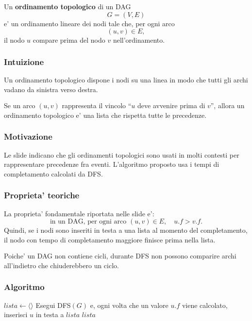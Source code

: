Un \textbf{ordinamento topologico} di un DAG
\[
G=(V,E)
\]
e' un ordinamento lineare dei nodi tale che, per ogni arco
\[
(u,v)\in E,
\]
il nodo $u$ compare prima del nodo $v$ nell'ordinamento.

\subsubsection{Intuizione}
Un ordinamento topologico dispone i nodi su una linea in modo che tutti gli archi vadano da sinistra verso destra.

Se un arco $(u,v)$ rappresenta il vincolo ``$u$ deve avvenire prima di $v$'', allora un ordinamento topologico e' una lista che rispetta tutte le precedenze.

\subsubsection{Motivazione}
Le slide indicano che gli ordinamenti topologici sono usati in molti contesti per rappresentare precedenze fra eventi. L'algoritmo proposto usa i tempi di completamento calcolati da DFS.

\subsubsection{Proprieta' teoriche}
La proprieta' fondamentale riportata nelle slide e':
\[
\text{in un DAG, per ogni arco }(u,v)\in E,\quad u.f>v.f.
\]
Quindi, se i nodi sono inseriti in testa a una lista al momento del completamento, il nodo con tempo di completamento maggiore finisce prima nella lista.

Poiche' un DAG non contiene cicli, durante DFS non possono comparire archi all'indietro che chiuderebbero un ciclo.

\subsubsection{Algoritmo}
\begin{algorithm}[H]
	\caption{\textsc{Topological-Sort}$(G)$}
	$lista\gets\langle\rangle$\;
	Esegui \textsc{DFS}$(G)$ e, ogni volta che un valore $u.f$ viene calcolato, inserisci $u$ in testa a $lista$\;
	\Return $lista$\;
\end{algorithm}


